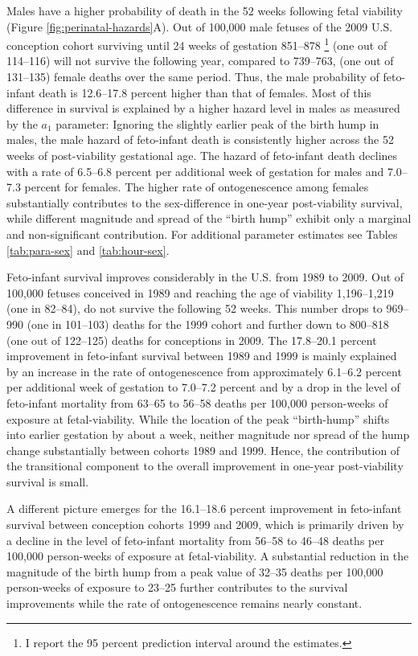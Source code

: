 \documentclass[10pt, twoside]{article}
\let\oldfootnote\footnote
\renewcommand\footnote[1]{%
\oldfootnote{\hspace{0.6mm}#1}}
\begin{document}
Males have a higher probability of death in the 52 weeks following fetal viability (Figure \ref{fig:perinatal-hazards}A). Out of 100,000 male fetuses of the 2009 U.S. conception cohort surviving until 24 weeks of gestation 851--878\footnote{I report the 95 percent prediction interval around the estimates.} (one out of 114--116) will not survive the following year, compared to 739--763, (one out of 131--135) female deaths over the same period. Thus, the male probability of feto-infant death is 12.6--17.8 percent higher than that of females. Most of this difference in survival is explained by a higher hazard level in males as measured by the \(a_1\) parameter: Ignoring the slightly earlier peak of the birth hump in males, the male hazard of feto-infant death is consistently higher across the 52 weeks of post-viability gestational age. The hazard of feto-infant death declines with a rate of 6.5--6.8 percent per additional week of gestation for males and 7.0--7.3 percent for females. The higher rate of ontogenescence among females substantially contributes to the sex-difference in one-year post-viability survival, while different magnitude and spread of the ``birth hump'' exhibit only a marginal and non-significant contribution. For additional parameter estimates see Tables \ref{tab:para-sex} and \ref{tab:hour-sex}.

Feto-infant survival improves considerably in the U.S. from 1989 to 2009. Out of 100,000 fetuses conceived in 1989 and reaching the age of viability 1,196--1,219 (one in 82--84), do not survive the following 52 weeks. This number drops to 969--990 (one in 101--103) deaths for the 1999 cohort and further down to 800--818 (one out of 122--125) deaths for conceptions in 2009. The 17.8--20.1 percent improvement in feto-infant survival between 1989 and 1999 is mainly explained by an increase in the rate of ontogenescence from approximately 6.1--6.2 percent per additional week of gestation to 7.0--7.2 percent and by a drop in the level of feto-infant mortality from 63--65 to 56--58 deaths per 100,000 person-weeks of exposure at fetal-viability. While the location of the peak ``birth-hump'' shifts into earlier gestation by about a week, neither magnitude nor spread of the hump change substantially between cohorts 1989 and 1999. Hence, the contribution of the transitional component to the overall improvement in one-year post-viability survival is small.

A different picture emerges for the 16.1--18.6 percent improvement in feto-infant survival between conception cohorts 1999 and 2009, which is primarily driven by a decline in the level of feto-infant mortality from 56--58 to 46--48 deaths per 100,000 person-weeks of exposure at fetal-viability. A substantial reduction in the magnitude of the birth hump from a peak value of 32--35 deaths per 100,000 person-weeks of exposure to 23--25 further contributes to the survival improvements while the rate of ontogenescence remains nearly constant.
\end{document}
